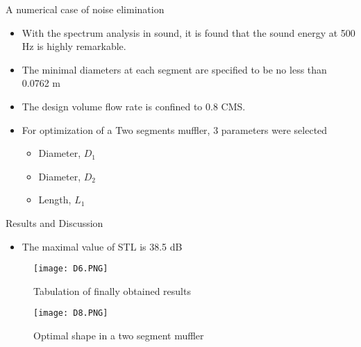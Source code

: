 \documentclass{beamer}
\begin{document}
\begin{frame}{A numerical case of noise elimination}
\begin{block}{}
\begin{itemize}
  \item With the spectrum analysis in sound, it is found that the sound energy at 500 Hz is highly remarkable.\item The minimal diameters at each segment are specified to be no less than 0.0762
m
\item The design volume flow rate is confined to 0.8 CMS.
\item For optimization of a Two segments muffler, 3 parameters were selected
\begin{itemize}
\item Diameter, $D_{1}$
\item Diameter, $D_{2}$
\item Length, $L_{1}$
\end{itemize}
\end{itemize}
\end{block}
\end{frame}

\begin{frame}{Results and Discussion}
\begin{itemize}
\item The maximal value of STL is 38.5 dB
\end{itemize}
\begin{figure}
\texttt{[image: D6.PNG]}
\caption{\label{fig:your-figure13}Tabulation of finally obtained  results}
\end{figure}
\begin{figure}
\texttt{[image: D8.PNG]}
\caption{\label{fig:your-figure13} Optimal shape in a two segment muffler}
\end{figure}
\end{frame}
\end{document}
